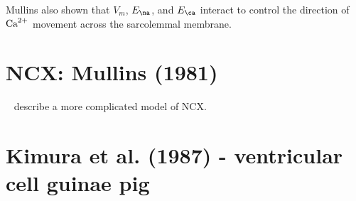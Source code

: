 Mullins also shown that $V_m$, $E_\na$, and $E_\ca$ interact to
control the direction of ${\text{Ca}^{2+}}$ movement across the sarcolemmal
membrane.



\section{NCX: Mullins (1981)}
\label{sec:ncx:-mullins-1981}

~\citep{mullins1981} describe a more complicated model of NCX.

\section{Kimura et al. (1987) - ventricular cell guinae pig}
\label{sec:NCX_Kimura_1987}

